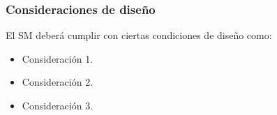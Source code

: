 \subsubsection{Consideraciones de diseño}
El SM deberá cumplir con ciertas condiciones de diseño como:
\begin{itemize}
    \item Consideración 1.
    \item Consideración 2.
    \item Consideración 3.
\end{itemize}